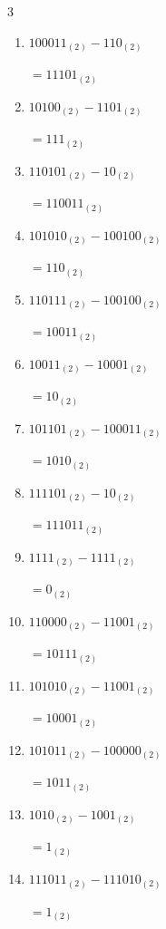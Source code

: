 \begin{multicols}{3}
\begin{enumerate}
  \item $100011_{(2)} - 110_{(2)}$

        $=11101_{(2)}$

  \item $10100_{(2)} - 1101_{(2)}$

        $=111_{(2)}$

  \item $110101_{(2)} - 10_{(2)}$

        $=110011_{(2)}$

  \item $101010_{(2)} - 100100_{(2)}$

        $=110_{(2)}$

\columnbreak %

  \item $110111_{(2)} - 100100_{(2)}$

        $=10011_{(2)}$

  \item $10011_{(2)} - 10001_{(2)}$

        $=10_{(2)}$

  \item $101101_{(2)} - 100011_{(2)}$

        $=1010_{(2)}$

  \item $111101_{(2)} - 10_{(2)}$

        $=111011_{(2)}$

  \item $1111_{(2)} - 1111_{(2)}$

        $=0_{(2)}$

  \item $110000_{(2)} - 11001_{(2)}$

        $=10111_{(2)}$

  \item $101010_{(2)} - 11001_{(2)}$

        $=10001_{(2)}$

  \item $101011_{(2)} - 100000_{(2)}$

        $=1011_{(2)}$

  \item $1010_{(2)} - 1001_{(2)}$

        $=1_{(2)}$

  \item $111011_{(2)} - 111010_{(2)}$

        $=1_{(2)}$

\columnbreak %


\end{enumerate}
\end{multicols}
